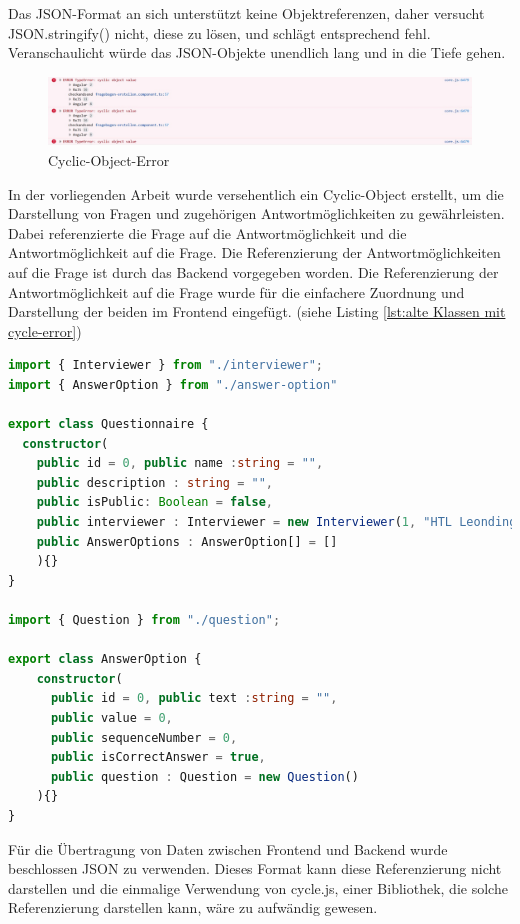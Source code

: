 Das JSON-Format an sich unterstützt keine Objektreferenzen, daher versucht JSON.stringify() nicht, diese zu lösen, und schlägt entsprechend fehl. 
Veranschaulicht würde das JSON-Objekte unendlich lang und in die Tiefe gehen.
\begin{figure}[H]
  \includegraphics[width=1.2\textwidth]{pics/cycle_object.jpeg}
  \centering
  \caption{Cyclic-Object-Error}
  \label{fig:cycle}
\end{figure}
In der vorliegenden Arbeit wurde versehentlich ein Cyclic-Object erstellt, um die Darstellung von Fragen und zugehörigen
Antwortmöglichkeiten zu gewährleisten. Dabei referenzierte die Frage auf die Antwortmöglichkeit und die Antwortmöglichkeit auf die Frage.
Die Referenzierung der Antwortmöglichkeiten auf die Frage ist durch das Backend vorgegeben worden. Die Referenzierung der Antwortmöglichkeit auf die Frage 
wurde für die einfachere Zuordnung und Darstellung der beiden im Frontend eingefügt. (siehe Listing \ref{lst:alte Klassen mit cycle-error})
\begin{lstlisting}[language=TypeScript, caption=Klassen mit Cyclic-Error, label=lst:alte Klassen mit cycle-error]
import { Interviewer } from "./interviewer";
import { AnswerOption } from "./answer-option"

export class Questionnaire {
  constructor(
    public id = 0, public name :string = "", 
    public description : string = "", 
    public isPublic: Boolean = false, 
    public interviewer : Interviewer = new Interviewer(1, "HTL Leonding"),
    public AnswerOptions : AnswerOption[] = []
    ){}
}

import { Question } from "./question";

export class AnswerOption {
    constructor(
      public id = 0, public text :string = "", 
      public value = 0, 
      public sequenceNumber = 0, 
      public isCorrectAnswer = true, 
      public question : Question = new Question()
    ){}
}
\end{lstlisting}
Für die Übertragung von Daten zwischen Frontend und Backend wurde beschlossen JSON zu verwenden.
Dieses Format kann diese Referenzierung nicht darstellen und die einmalige Verwendung von
cycle.js, einer Bibliothek, die solche Referenzierung darstellen kann, wäre zu aufwändig gewesen.
\newline
